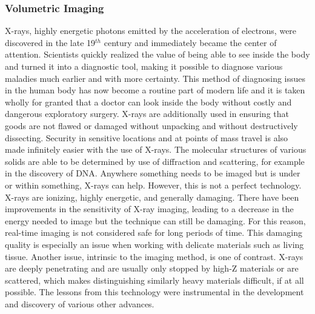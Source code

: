 \subsubsection{Volumetric Imaging}
X-rays, highly energetic photons emitted by the acceleration of electrons, were discovered in the late 19$^{th}$ century and immediately became the center of attention. Scientists quickly realized the value of being able to see inside the body and turned it into a diagnostic tool, making it possible to diagnose various maladies much earlier and with more certainty. This method of diagnosing issues in the human body has now become a routine part of modern life and it is taken wholly for granted that a doctor can look inside the body without costly and dangerous exploratory surgery. X-rays are additionally used in ensuring that goods are not flawed or damaged without unpacking and without destructively dissecting. Security in sensitive locations and at points of mass travel is also made infinitely easier with the use of X-rays. The molecular structures of various solids are able to be determined by use of diffraction and scattering, for example in the discovery of DNA. Anywhere something needs to be imaged but is under or within something, X-rays can help. However, this is not a perfect technology. X-rays are ionizing, highly energetic, and generally damaging. There have been improvements in the sensitivity of X-ray imaging, leading to a decrease in the energy needed to image but the technique can still be damaging. For this reason, real-time imaging is not considered safe for long periods of time. This damaging quality is especially an issue when working with delicate materials such as living tissue. Another issue, intrinsic to the imaging method, is one of contrast. X-rays are deeply penetrating and are usually only stopped by high-Z materials or are scattered, which makes distinguishing similarly heavy materials difficult, if at all possible. The lessons from this technology were instrumental in the development and discovery of various other advances.\\

